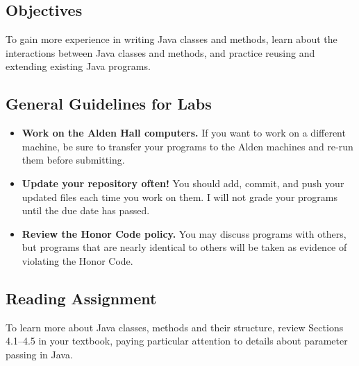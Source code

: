 



\vspace{-0.2in}
\subsection*{Objectives}
\vspace{-0.05in}

To gain more experience in writing Java classes and methods, learn about the interactions between Java classes and
methods, and practice reusing and extending existing Java programs.  

\vspace{-0.2in}
\subsection*{General Guidelines for Labs}
\vspace{-0.05in}
\begin{itemize}
\item
{\bf Work on the Alden Hall computers.} If you want to work on a different
machine, be sure to transfer your programs to the Alden
machines and re-run them before submitting.
\item
{\bf Update your repository often!} You should add, commit, 
and push your updated files each time you work on them.  I will not grade 
your programs until the due date has passed.
\item
{\bf Review the Honor Code policy.} You
may discuss programs with others, but programs that are nearly identical
to others will be taken as evidence of violating the Honor Code.
\end{itemize}

\vspace{-0.2in}
\subsection*{Reading Assignment}
\vspace{-0.05in}

To learn more about Java classes, methods and their structure, review Sections 4.1--4.5 in your textbook, paying
particular attention to details about parameter passing in Java.


